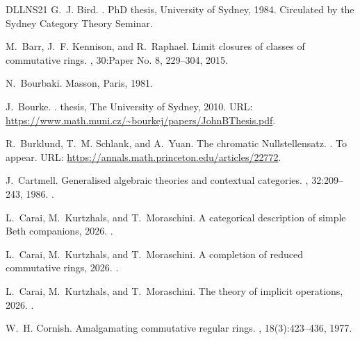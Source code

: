 \documentclass[a4paper,10pt,reqno]{amsart}
\theoremstyle{definition}
\theoremstyle{remark}
\begin{document}
\begin{thebibliography}{DLLNS21}
  G.~J. Bird.
  .
  \newblock PhD thesis, University of Sydney, 1984.
  \newblock Circulated by the Sydney Category Theory Seminar.
  
  M.~Barr, J.~F. Kennison, and R.~Raphael.
  \newblock Limit closures of classes of commutative rings.
  , 30:Paper No. 8, 229--304, 2015.
  
  N.~Bourbaki.
  \newblock Masson, Paris, 1981.
  
  J.~Bourke.
  .
   thesis, The University of Sydney, 2010.
  \newblock URL: \url{https://www.math.muni.cz/~bourkej/papers/JohnBThesis.pdf}.
  
  R.~Burklund, T.~M. Schlank, and A.~Yuan.
  \newblock The chromatic {N}ullstellensatz.
  .
  \newblock To appear.
  \newblock URL: \url{https://annals.math.princeton.edu/articles/22772}.
  
  J.~Cartmell.
  \newblock Generalised algebraic theories and contextual categories.
  , 32:209--243, 1986.
  \newblock \href {https://doi.org/10.1016/0168-0072(86)90053-9} {}.
  
  L.~Carai, M.~Kurtzhals, and T.~Moraschini.
  \newblock A categorical description of simple {B}eth companions, 2026.
  \newblock \href {https://arxiv.org/abs/2605.09141} {}.
  
  L.~Carai, M.~Kurtzhals, and T.~Moraschini.
  \newblock A completion of reduced commutative rings, 2026.
  \newblock \href {https://arxiv.org/abs/2605.12661} {}.
  
  L.~Carai, M.~Kurtzhals, and T.~Moraschini.
  \newblock The theory of implicit operations, 2026.
  \newblock \href {https://arxiv.org/abs/2512.14326} {}.
  
  W.~H. Cornish.
  \newblock Amalgamating commutative regular rings.
  , 18(3):423--436, 1977.
  

\end{thebibliography}
\end{document}
